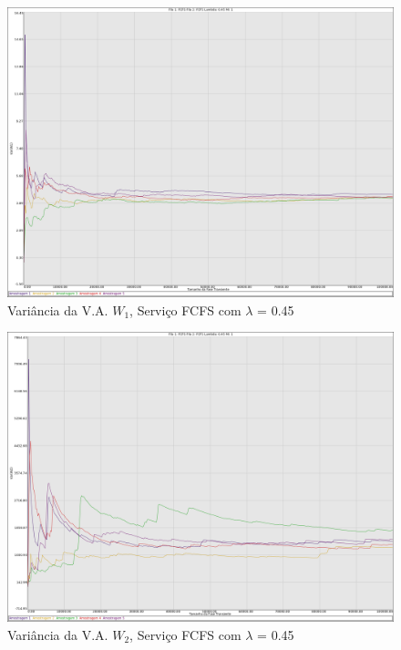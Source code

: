 \documentclass[a4paper,10pt]{article}
\begin{document}
\begin{figure}
	\caption{Variância da V.A. $W_1$, Serviço FCFS com $\lambda$ = 0.45}
	\label{figTransienteFCFSfila1VarW}
	\includegraphics[scale = 0.20]{./graficos_transiente_1/FCFS/09.png}
\end{figure}

\begin{figure}
	\caption{Variância da V.A. $W_2$, Serviço FCFS com $\lambda$ = 0.45}
	\label{figTransienteFCFSfila2VarW}
	\includegraphics[scale = 0.20]{./graficos_transiente_1/FCFS/10.png}
\end{figure}

\clearpage
\end{document}

